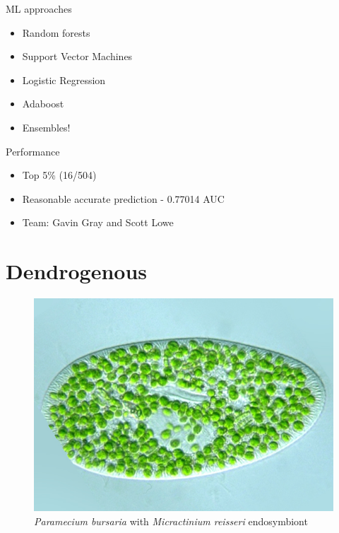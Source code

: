 \documentclass[ignorenonframetext,]{beamer}
\begin{document}
\begin{frame}{ML approaches}

\begin{itemize}
\itemsep1pt\parskip0pt
\item
  Random forests
\item
  Support Vector Machines
\item
  Logistic Regression
\item
  Adaboost
\item
  Ensembles!
\end{itemize}

\end{frame}

\begin{frame}{Performance}

\begin{itemize}
\itemsep1pt\parskip0pt
\item
  Top 5\% (16/504)
\item
  Reasonable accurate prediction - 0.77014 AUC
\item
  Team: Gavin Gray and Scott Lowe
\end{itemize}

\end{frame}

\section{Dendrogenous}\label{dendrogenous}

\begin{frame}

\begin{figure}[htbp]
\centering
\includegraphics{assets/presentation/GIML/pbmr.jpg}
\caption{\emph{Paramecium bursaria} with \emph{Micractinium reisseri}
endosymbiont}
\end{figure}

\end{frame}
\end{document}
